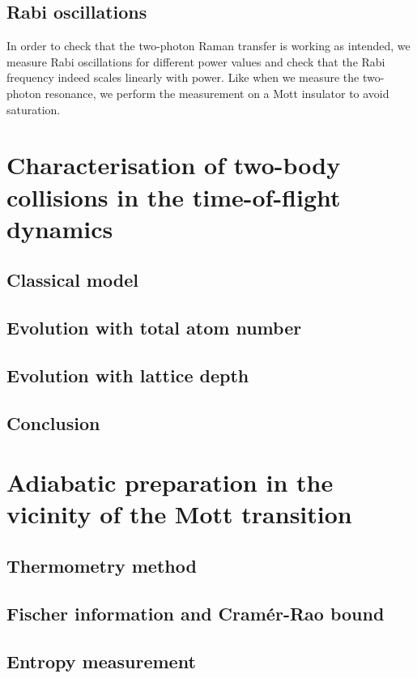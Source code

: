 
\subsection{Rabi oscillations}

In order to check that the two-photon Raman transfer is working as intended, we measure Rabi oscillations for different power values and check that the Rabi frequency indeed scales linearly with power. Like when we measure the two-photon resonance, we perform the measurement on a Mott insulator to avoid saturation.




\section{Characterisation of two-body collisions in the time-of-flight dynamics}

\subsection{Classical model}

\subsection{Evolution with total atom number}

\subsection{Evolution with lattice depth}

\subsection{Conclusion}

\section{Adiabatic preparation in the vicinity of the Mott transition}

\subsection{Thermometry method}

\subsection{Fischer information and Cramér-Rao bound}

\subsection{Entropy measurement}
